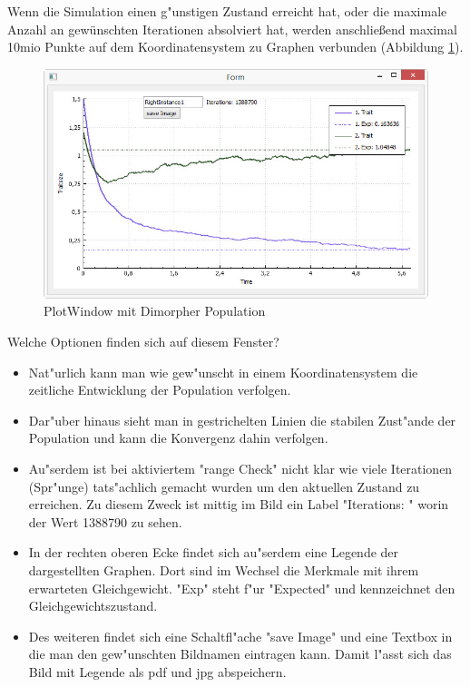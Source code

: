 \documentclass[11pt, a4paper, german]{article}
\theoremstyle{plain}
\begin{document}
	Wenn die Simulation  einen g"unstigen Zustand erreicht hat, oder die maximale Anzahl an gewünschten Iterationen absolviert hat, werden anschließend maximal 10mio Punkte auf dem Koordinatensystem zu Graphen verbunden (Abbildung \ref{PlotWindow_smallBPDL}). 
	\begin{figure}[H]
		\centering
		\includegraphics[width=1\linewidth]{./Pictures/PlotWindow_smallBPDL}
		\caption[PlotWindow]{PlotWindow mit Dimorpher Population}
		\label{PlotWindow_smallBPDL}
	\end{figure}
	
	Welche Optionen finden sich auf diesem Fenster?\\
	\begin{itemize}
		\item Nat"urlich kann man wie gew"unscht in einem Koordinatensystem die zeitliche Entwicklung der Population verfolgen.
		\item Dar"uber hinaus sieht man in gestrichelten Linien die stabilen Zust"ande der Population und kann die Konvergenz dahin verfolgen.
		\item Au"serdem ist bei aktiviertem "{}range Check"{} nicht klar wie viele Iterationen (Spr"unge) tats"achlich gemacht wurden um den aktuellen Zustand zu erreichen. Zu diesem Zweck ist mittig im Bild ein Label "{}Iterations: "{} worin der Wert 1388790 zu sehen.
		\item In der rechten oberen Ecke findet sich au"serdem eine Legende der dargestellten Graphen. Dort sind im Wechsel die Merkmale mit ihrem erwarteten Gleichgewicht. "{}Exp"{} steht f"ur "{}Expected"{} und kennzeichnet den Gleichgewichtszustand.
		\item Des weiteren findet sich eine Schaltfl"ache "{}save Image"{} und eine Textbox in die man den gew"unschten Bildnamen eintragen kann. Damit l"asst sich das Bild mit Legende als pdf und jpg abspeichern.
	\end{itemize}
\end{document}
